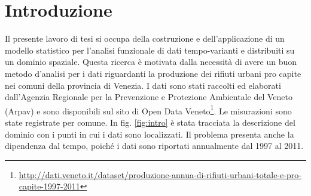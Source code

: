 \documentclass[a4paper,11pt,twoside,openright]{book}							%
\begin{document}
\chapter*{Introduzione}
\label{Cap:intro}
\thispagestyle{empty}

Il presente lavoro di tesi si occupa della costruzione e dell'applicazione di un modello statistico per l'analisi funzionale di dati tempo-varianti e distribuiti su un dominio spaziale. Questa ricerca è motivata dalla necessità di avere un buon metodo d'analisi per i dati riguardanti la produzione dei rifiuti urbani pro capite nei comuni della provincia di Venezia. I dati sono stati raccolti ed elaborati dall'Agenzia Regionale per la Prevenzione e Protezione Ambientale del Veneto (Arpav) e sono disponibili sul sito di Open Data Veneto\footnote{\href{http://dati.veneto.it/dataset/produzione-annua-di-rifiuti-urbani-totale-e-pro-capite-1997-2011}{http://dati.veneto.it/dataset/produzione-annua-di-rifiuti-urbani-totale-e-pro-capite-1997-2011}}. Le misurazioni sono state registrate per comune. In fig. \ref{fig:intro} è stata tracciata la descrizione del dominio con i punti in cui i dati sono localizzati. Il problema presenta anche la dipendenza dal tempo, poiché i dati sono riportati annualmente dal 1997 al 2011.
\end{document}
